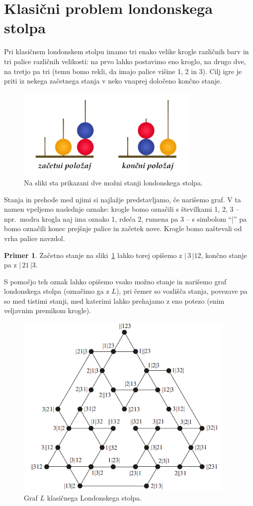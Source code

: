 \documentclass[12pt,a4paper]{amsart}
\theoremstyle{definition} %
\newtheorem{primer}[definicija]{Primer}
\theoremstyle{plain} %
\newcommand{\bd}{\ensuremath{|\,}}
\newcommand{\ed}{\ensuremath{\,|}}
\begin{document}
\section{Klasični problem londonskega stolpa}
Pri klasičnem londonskem stolpu imamo tri enako velike krogle različnih barv in tri palice različnih velikosti: na prvo lahko postavimo eno kroglo, na drugo dve, na tretjo pa tri (temu bomo rekli, da imajo palice višine 1, 2 in 3). Cilj igre je priti iz nekega začetnega stanja v neko vnaprej določeno končno stanje.

\begin{figure}[h]
    \includegraphics[width=250pt]{img/london-tower.png}
    \caption{Na sliki sta prikazani dve možni stanji londonskega stolpa.}
    \label{fig:stanji}
\end{figure}

Stanja in prehode med njimi si najlažje predstavljamo, če narišemo graf. V ta namen vpeljemo naslednje oznake:
krogle bomo označili s številkami 1, 2, 3 -- npr.\ modra krogla naj ima oznako 1, rdeča 2, rumena pa 3 -- s simbolom ``|'' pa bomo označili konec prejšnje palice in začetek nove. Krogle bomo naštevali od vrha palice navzdol.

\begin{primer}
    Začetno stanje na sliki~\ref{fig:stanji} lahko torej opišemo z $\bd 3 \ed 12$, končno stanje pa z $\bd 21 \ed 3$.
\end{primer}
\medskip

S pomočjo teh oznak lahko opišemo vsako možno stanje in narišemo graf londonskega stolpa (označimo ga z $L$), pri čemer so vozlišča stanja, povezave pa so med tistimi stanji, med katerimi lahko prehajamo z eno potezo (enim veljavnim premikom krogle).

\begin{figure}[h!]
    \includegraphics[width=300pt]{img/tolgraph.png}
    \caption{Graf $L$ klasičnega Londonskega stolpa.}
    \label{fig:tolgraph}
\end{figure}
\end{document}
